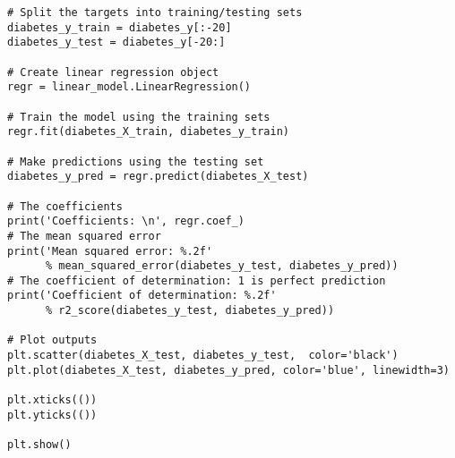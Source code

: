 {\begin{lstlisting}
# Split the targets into training/testing sets
diabetes_y_train = diabetes_y[:-20]
diabetes_y_test = diabetes_y[-20:]

# Create linear regression object
regr = linear_model.LinearRegression()

# Train the model using the training sets
regr.fit(diabetes_X_train, diabetes_y_train)

# Make predictions using the testing set
diabetes_y_pred = regr.predict(diabetes_X_test)

# The coefficients
print('Coefficients: \n', regr.coef_)
# The mean squared error
print('Mean squared error: %.2f'
      % mean_squared_error(diabetes_y_test, diabetes_y_pred))
# The coefficient of determination: 1 is perfect prediction
print('Coefficient of determination: %.2f'
      % r2_score(diabetes_y_test, diabetes_y_pred))

# Plot outputs
plt.scatter(diabetes_X_test, diabetes_y_test,  color='black')
plt.plot(diabetes_X_test, diabetes_y_pred, color='blue', linewidth=3)

plt.xticks(())
plt.yticks(())

plt.show()
\end{lstlisting}

}
